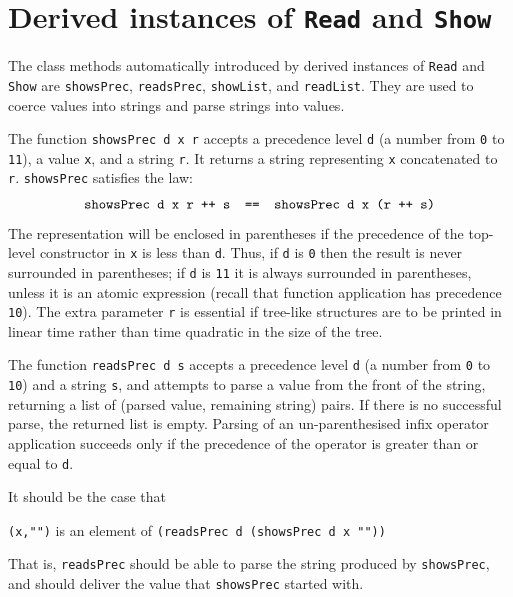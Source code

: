 \section{Derived instances of \texorpdfstring{\mbox{\tt Read}}{Read} and \texorpdfstring{\mbox{\tt Show}}{Show}}
\label{derived-text}
The class methods automatically introduced by derived instances
of \mbox{\tt Read} and \mbox{\tt Show} are \mbox{\tt showsPrec},
\mbox{\tt readsPrec},
\mbox{\tt showList}, and \mbox{\tt readList}.
They are used to coerce values into strings and parse strings into
values.

The function \mbox{\tt showsPrec\ d\ x\ r} accepts a precedence level \mbox{\tt d}
(a number from \mbox{\tt 0} to \mbox{\tt 11}), a value \mbox{\tt x}, and a string \mbox{\tt r}.
It returns a string representing \mbox{\tt x} concatenated to \mbox{\tt r}.
\mbox{\tt showsPrec} satisfies the law:
\[
\mbox{$\it \makebox{\tt showsPrec\ d\ x\ r\ ++\ s\ \ ==\ \ showsPrec\ d\ x\ (r\ ++\ s)}$}
\]
The representation will be enclosed in parentheses if the precedence
of the top-level constructor in \mbox{\tt x} is less than \mbox{\tt d}.  Thus,
if \mbox{\tt d} is \mbox{\tt 0} then the result is never surrounded in parentheses; if
\mbox{\tt d} is \mbox{\tt 11} it is always surrounded in parentheses, unless it is an
atomic expression (recall that function application has precedence \mbox{\tt 10}).
The extra parameter \mbox{\tt r} is essential if tree-like
structures are to be printed in linear time rather than time quadratic
in the size of the tree.

The function \mbox{\tt readsPrec\ d\ s} accepts a precedence level \mbox{\tt d} (a number
from \mbox{\tt 0} to \mbox{\tt 10}) and a string \mbox{\tt s}, and attempts to parse a value 
from the front of the string, returning a list of (parsed value, remaining string) pairs.
If there is no successful parse, the returned list is empty.
Parsing of an un-parenthesised infix operator application succeeds only 
if the precedence of the operator is greater than or equal to \mbox{\tt d}.

It should be the case that
\begin{center}
\mbox{\tt (x,"")}  is an element of  \mbox{\tt (readsPrec\ d\ (showsPrec\ d\ x\ ""))}
\end{center}
That is, \mbox{\tt readsPrec} should be able to parse the string produced
by \mbox{\tt showsPrec}, and should deliver the value that \mbox{\tt showsPrec} started
with.

